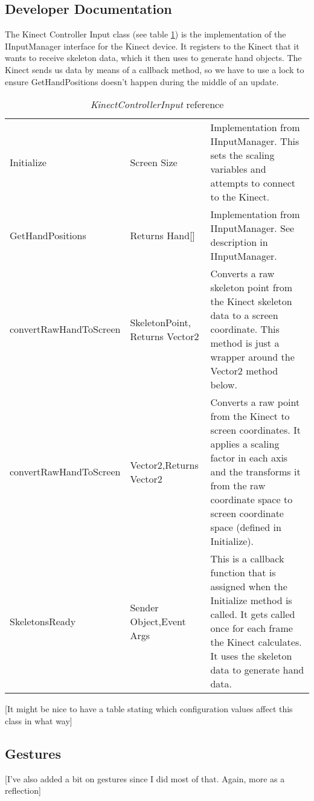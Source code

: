 \clearpage{}
\subsection{Developer Documentation}
The Kinect Controller Input class (see table \ref{KinectInputRef}) is the implementation of the IInputManager interface for the Kinect device. It registers to the Kinect that it wants to receive skeleton data, which it then uses to generate hand objects. The Kinect sends us data by means of a callback method, so we have to use a lock to ensure GetHandPositions doesn't happen during the middle of an update.

\begin{table}[h]
\begin{tabular}{|>{\raggedright}p{5cm}|>{\raggedright}p{3.6cm}|>{\raggedright}p{7cm}|}
\hline 
\multicolumn{3}{|c|}{KinectControllerInput}\tabularnewline
\hline 
Initialize & Screen Size & Implementation from IInputManager. This sets the scaling variables
and attempts to connect to the Kinect.\tabularnewline
\hline 
GetHandPositions & Returns Hand{[}{]} & Implementation from IInputManager. See description in IInputManager.\tabularnewline
\hline 
convertRawHandToScreen & SkeletonPoint, Returns Vector2 & Converts a raw skeleton point from the Kinect skeleton data to a screen
coordinate. This method is just a wrapper around the Vector2 method
below.\tabularnewline
\hline 
convertRawHandToScreen & Vector2,\newline Returns Vector2 & Converts a raw point from the Kinect to screen coordinates. It applies
a scaling factor in each axis and the transforms it from the raw coordinate
space to screen coordinate space (defined in Initialize).\tabularnewline
\hline 
SkeletonsReady & Sender Object,\newline Event Args & This is a callback function that is assigned when the Initialize method
is called. It gets called once for each frame the Kinect calculates.
It uses the skeleton data to generate hand data.\tabularnewline
\hline 
\end{tabular}

\caption{\emph{KinectControllerInput} reference}

\label{KinectInputRef}
\end{table}

[It might be nice to have a table stating which configuration values affect this class in what way]

\clearpage{}
\subsection{Gestures}
[I've also added a bit on gestures since I did most of that. Again, more as a reflection]

